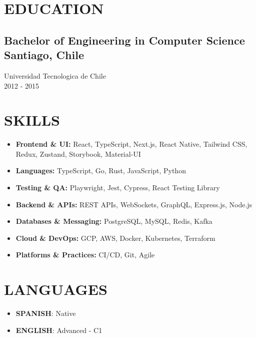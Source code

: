 \documentclass{article}
\newcommand{\SubHeading}[1]{
   \subsection*{#1}\vspace{-0.5em}
}
\begin{document}
\section*{EDUCATION}
\SubHeading{Bachelor of Engineering in Computer Science \hfill Santiago, Chile}
Universidad Tecnologica de Chile \\[0.1em]
2012 {-} 2015

\section*{SKILLS}
\begin{itemize}
	\item \textbf{Frontend \& UI:} React, TypeScript, Next.js, React Native, Tailwind CSS, Redux, Zustand, Storybook, Material-UI
	\item \textbf{Languages:} TypeScript, Go, Rust, JavaScript, Python
	\item \textbf{Testing \& QA:} Playwright, Jest, Cypress, React Testing Library
	\item \textbf{Backend \& APIs:} REST APIs, WebSockets, GraphQL, Express.js, Node.js
	\item \textbf{Databases \& Messaging:} PostgreSQL, MySQL, Redis, Kafka
	\item \textbf{Cloud \& DevOps:} GCP, AWS, Docker, Kubernetes, Terraform
	\item \textbf{Platforms \& Practices:} CI/CD, Git, Agile
\end{itemize}

\section*{LANGUAGES}
\begin{itemize}[left=0pt]
	\item \textbf{SPANISH}: Native
	\item \textbf{ENGLISH}: Advanced {-} C1
\end{itemize}
\end{document}
